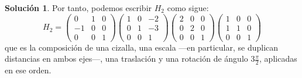 \documentclass[a4paper, 11pt]{article}
\theoremstyle{definition}
\newtheorem*{solucion}{Solución}
\theoremstyle{theorem}
\begin{document}
\begin{solucion}
      Por tanto, podemos escribir $H_2$ como sigue:
      \[
      H_2 =
      \left(\begin{array}{ccc}
          0 & 1 & 0 \\
          -1 & 0 & 0 \\
          0 & 0 & 1
      \end{array}
      \right)
      \left(
      \begin{array}{ccc}
          1 & 0 & -2 \\
          0 & 1 & -3 \\
          0 & 0 & 1
      \end{array}
      \right)
      \left(
      \begin{array}{ccc}
          2 & 0 & 0 \\
          0 & 2 & 0 \\
          0 & 0 & 1
      \end{array}
      \right)
      \left(
      \begin{array}{ccc}
          1 & 0 & 0 \\
          1 & 1 & 0 \\
          0 & 0 & 1
      \end{array}
      \right)
      \]
      que es la composición de una cizalla, una escala ---en particular, se duplican distancias en ambos ejes---, una traslación y una rotación de ángulo $3\frac{\pi}{2}$, aplicadas en ese orden.


\end{solucion}
\end{document}
